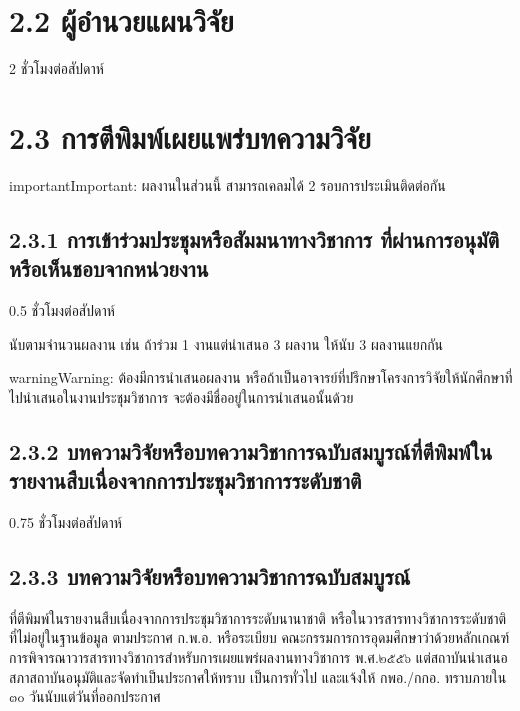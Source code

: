 \documentclass[a4paper,12pt,english]{sphinxmanual}
\begin{document}
\section{2.2 ผู้อำนวยแผนวิจัย}
\label{\detokenize{2research:id9}}
2 ชั่วโมงต่อสัปดาห์


\section{2.3 การตีพิมพ์เผยแพร่บทความวิจัย}
\label{\detokenize{2research:id10}}\label{\detokenize{2research:id11}}
\begin{sphinxadmonition}{important}{Important:}
ผลงานในส่วนนี้ สามารถเคลมได้ 2 รอบการประเมินติดต่อกัน
\end{sphinxadmonition}


\subsection{2.3.1 การเข้าร่วมประชุมหรือสัมมนาทางวิชาการ ที่ผ่านการอนุมัติหรือเห็นชอบจากหน่วยงาน}
\label{\detokenize{2research:id12}}
0.5 ชั่วโมงต่อสัปดาห์

นับตามจำนวนผลงาน เช่น ถ้าร่วม 1 งานแต่นำเสนอ 3 ผลงาน ให้นับ 3 ผลงานแยกกัน

\begin{sphinxadmonition}{warning}{Warning:}
ต้องมีการนำเสนอผลงาน หรือถ้าเป็นอาจารย์ที่ปรึกษาโครงการวิจัยให้นักศึกษาที่ไปนำเสนอในงานประชุมวิชาการ จะต้องมีชื่ออยู่ในการนำเสนอนั้นด้วย
\end{sphinxadmonition}


\subsection{2.3.2 บทความวิจัยหรือบทความวิชาการฉบับสมบูรณ์ที่ตีพิมพ์ในรายงานสืบเนื่องจากการประชุมวิชาการระดับชาติ}
\label{\detokenize{2research:id13}}
0.75 ชั่วโมงต่อสัปดาห์


\subsection{2.3.3 บทความวิจัยหรือบทความวิชาการฉบับสมบูรณ์}
\label{\detokenize{2research:id14}}
ที่ตีพิมพ์ในรายงานสืบเนื่องจากการประชุมวิชาการระดับนานาชาติ หรือในวารสารทางวิชาการระดับชาติที่ไม่อยู่ในฐานข้อมูล ตามประกาศ ก.พ.อ. หรือระเบียบ คณะกรรมการการอุดมศึกษาว่าด้วยหลักเกณฑ์การพิจารณาวารสารทางวิชาการสำหรับการเผยแพร่ผลงานทางวิชาการ พ.ศ.๒๕๕๖ แต่สถาบันนำเสนอสภาสถาบันอนุมัติและจัดทำเป็นประกาศให้ทราบ เป็นการทั่วไป และแจ้งให้ กพอ./กกอ. ทราบภายใน ๓๐ วันนับแต่วันที่ออกประกาศ
\end{document}
